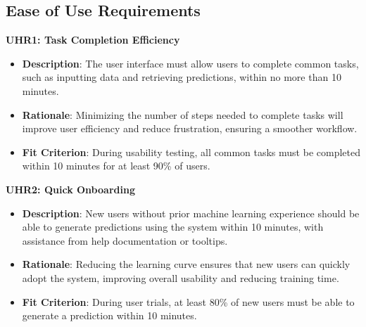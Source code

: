 \documentclass[12pt]{article}
\begin{document}
\subsection{Ease of Use Requirements}
\textbf{UHR1: Task Completion Efficiency}
\begin{itemize}
    \item \textbf{Description}: The user interface must allow users to complete
    common tasks, such as inputting data and retrieving predictions, within no
    more than 10 minutes.
    \item \textbf{Rationale}: Minimizing the number of steps needed to complete
    tasks will improve user efficiency and reduce frustration, ensuring a
    smoother workflow.
    \item \textbf{Fit Criterion}: During usability testing, all common tasks
    must be completed within 10 minutes for at least 90\% of users.
\end{itemize}
\textbf{UHR2: Quick Onboarding}
\begin{itemize}
    \item \textbf{Description}: New users without prior machine learning
    experience should be able to generate predictions using the system within
    10 minutes, with assistance from help documentation or tooltips.
    \item \textbf{Rationale}: Reducing the learning curve ensures that new
    users can quickly adopt the system, improving overall usability and
    reducing training time.
    \item \textbf{Fit Criterion}: During user trials, at least 80\% of new
    users must be able to generate a prediction within 10 minutes.
\end{itemize}
\end{document}
